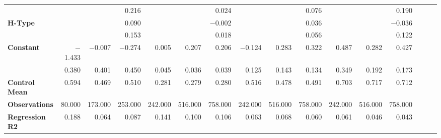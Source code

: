 \begin{tabular}{@{\extracolsep{5pt}}lrrrrrrrrrrrrrrr}
{\bf } & \phantom{***} & \phantom{***} & 0.216\phantom{\phantom{)}***} & \phantom{***} & \phantom{***} & 0.024\phantom{\phantom{)}***} & \phantom{***} & \phantom{***} & 0.076\phantom{\phantom{)}***} & \phantom{***} & \phantom{***} & 0.190\phantom{\phantom{)}***} \\
{\bf H-Type} & \phantom{***} & \phantom{***} & 0.090\phantom{\phantom{)}***} & \phantom{***} & \phantom{***} & $-$0.002\phantom{\phantom{)}***} & \phantom{***} & \phantom{***} & 0.036\phantom{\phantom{)}***} & \phantom{***} & \phantom{***} & $-$0.036\phantom{\phantom{)}***} \\
{\bf } & \phantom{***} & \phantom{***} & 0.153\phantom{\phantom{)}***} & \phantom{***} & \phantom{***} & 0.018\phantom{\phantom{)}***} & \phantom{***} & \phantom{***} & 0.056\phantom{\phantom{)}***} & \phantom{***} & \phantom{***} & 0.122\phantom{\phantom{)}***} \\
{\bf Constant} & $-$1.433\phantom{\phantom{)}***} & $-$0.007\phantom{\phantom{)}***} & $-$0.274\phantom{\phantom{)}***} & 0.005\phantom{\phantom{)}***} & 0.207\phantom{\phantom{)}***} & 0.206\phantom{\phantom{)}***} & $-$0.124\phantom{\phantom{)}***} & 0.283\phantom{\phantom{)}***} & 0.322\phantom{\phantom{)}***} & 0.487\phantom{\phantom{)}***} & 0.282\phantom{\phantom{)}***} & 0.427\phantom{\phantom{)}***} \\
{\bf } & 0.380\phantom{\phantom{)}***} & 0.401\phantom{\phantom{)}***} & 0.450\phantom{\phantom{)}***} & 0.045\phantom{\phantom{)}***} & 0.036\phantom{\phantom{)}***} & 0.039\phantom{\phantom{)}***} & 0.125\phantom{\phantom{)}***} & 0.143\phantom{\phantom{)}***} & 0.134\phantom{\phantom{)}***} & 0.349\phantom{\phantom{)}***} & 0.192\phantom{\phantom{)}***} & 0.173\phantom{\phantom{)}***} \\
{\bf Control Mean} & 0.594\phantom{\phantom{)}***} & 0.469\phantom{\phantom{)}***} & 0.510\phantom{\phantom{)}***} & 0.281\phantom{\phantom{)}***} & 0.279\phantom{\phantom{)}***} & 0.280\phantom{\phantom{)}***} & 0.516\phantom{\phantom{)}***} & 0.478\phantom{\phantom{)}***} & 0.491\phantom{\phantom{)}***} & 0.703\phantom{\phantom{)}***} & 0.717\phantom{\phantom{)}***} & 0.712\phantom{\phantom{)}***} \\
{\bf Observations} & 80.000\phantom{***} & 173.000\phantom{***} & 253.000\phantom{***} & 242.000\phantom{***} & 516.000\phantom{***} & 758.000\phantom{***} & 242.000\phantom{***} & 516.000\phantom{***} & 758.000\phantom{***} & 242.000\phantom{***} & 516.000\phantom{***} & 758.000\phantom{***} \\
{\bf Regression R2} & 0.188\phantom{***} & 0.064\phantom{***} & 0.087\phantom{***} & 0.141\phantom{***} & 0.100\phantom{***} & 0.106\phantom{***} & 0.063\phantom{***} & 0.068\phantom{***} & 0.060\phantom{***} & 0.061\phantom{***} & 0.046\phantom{***} & 0.043\phantom{***} \\
\hline
\end{tabular}
